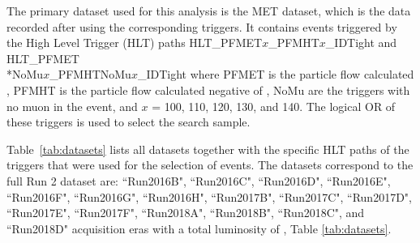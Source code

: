 \label{sec:samples}
The primary dataset used for this analysis is the MET dataset, which is the data recorded after using the corresponding \met triggers.
It contains events triggered by the High Level Trigger (HLT) paths HLT\_PFMET$x$\_PFMHT$x$\_IDTight and HLT\_PFMET\\*NoMu$x$\_PFMHTNoMu$x$\_IDTight where PFMET is the particle flow calculated \met, PFMHT is the particle flow calculated negative of \Ht, NoMu are the triggers with no muon in the event, and $x$ = 100, 110, 120, 130, and 140. The logical OR of these triggers is used to select the search sample. 
 
 Table~\ref{tab:datasets} lists all datasets together with the specific HLT paths of the triggers that were used for the selection of events. The datasets correspond to the full Run 2 dataset are: ``Run2016B", ``Run2016C", ``Run2016D", ``Run2016E", ``Run2016F", ``Run2016G", ``Run2016H", ``Run2017B", ``Run2017C", ``Run2017D", ``Run2017E", ``Run2017F", ``Run2018A", ``Run2018B", ``Run2018C", and ``Run2018D" acquisition eras with a total luminosity of \datalumi \cite{noauthor_cms_2017, noauthor_cms_2018, noauthor_cms_2019}, Table \ref{tab:datasets}.

